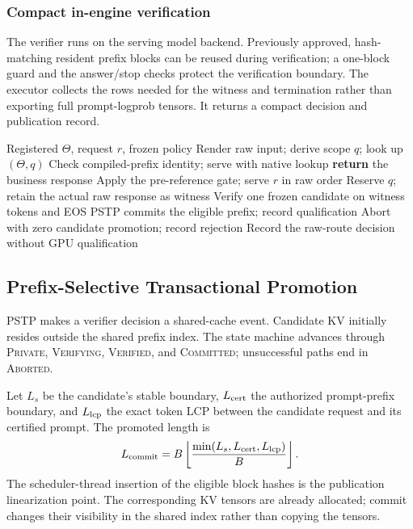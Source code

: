 \subsubsection{Compact in-engine verification}
The verifier runs on the serving model backend. Previously approved, hash-matching resident prefix blocks can be reused during verification; a one-block guard and the answer/stop checks protect the verification boundary. The executor collects the rows needed for the witness and termination rather than exporting full prompt-logprob tensors. It returns a compact decision and publication record.

\begin{algorithm}[t]
\small
\caption{Single-shot query qualification. All work remains on the service clock.}
\label{alg:query}
\begin{algorithmic}[1]
\REQUIRE Registered $\Theta$, request $r$, frozen policy
\STATE Render raw input; derive scope $q$; look up $(\Theta,q)$
  \STATE Check compiled-prefix identity; serve with native lookup
  \STATE \textbf{return} the business response
\ENDIF
\STATE Apply the pre-reference gate; serve $r$ in raw order
  \STATE Reserve $q$; retain the actual raw response as witness
    \STATE Verify one frozen candidate on witness tokens and EOS
      \STATE PSTP commits the eligible prefix; record qualification
    \ELSE
      \STATE Abort with zero candidate promotion; record rejection
    \ENDIF
  \ELSE
    \STATE Record the raw-route decision without GPU qualification
  \ENDIF
\ENDIF
\end{algorithmic}
\end{algorithm}

\subsection{Prefix-Selective Transactional Promotion}
\label{sec:pstp}
PSTP makes a verifier decision a shared-cache event. Candidate KV initially resides outside the shared prefix index. The state machine advances through \textsc{Private}, \textsc{Verifying}, \textsc{Verified}, and \textsc{Committed}; unsuccessful paths end in \textsc{Aborted}.

Let $L_s$ be the candidate's stable boundary, $L_{\rm cert}$ the authorized prompt-prefix boundary, and $L_{\rm lcp}$ the exact token LCP between the candidate request and its certified prompt. The promoted length is
\begin{equation}
 L_{\rm commit}=B\left\lfloor
 \frac{\min(L_s,L_{\rm cert},L_{\rm lcp})}{B}\right\rfloor.
\label{eq:commit}
\end{equation}
The scheduler-thread insertion of the eligible block hashes is the publication linearization point. The corresponding KV tensors are already allocated; commit changes their visibility in the shared index rather than copying the tensors.


